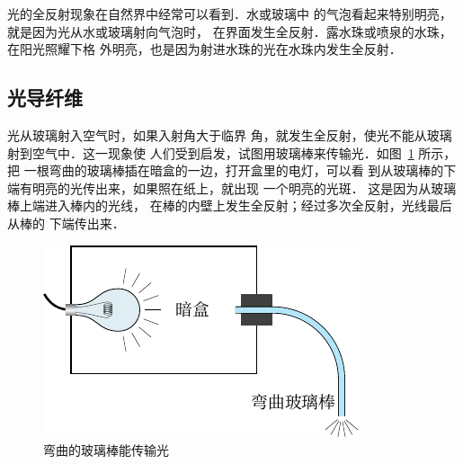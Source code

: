 光的全反射现象在自然界中经常可以看到．水或玻璃中
的气泡看起来特别明亮，就是因为光从水或玻璃射向气泡时，
在界面发生全反射．露水珠或喷泉的水珠，在阳光照耀下格
外明亮，也是因为射进水珠的光在水珠内发生全反射．

\subsection{光导纤维}


光从玻璃射入空气时，如果入射角大于临界
角，就发生全反射，使光不能从玻璃射到空气中．这一现象使
人们受到启发，试图用玻璃棒来传输光．如图~\ref{fig_C_5-24} 所示，把
一根弯曲的玻璃棒插在暗盒的一边，打开盒里的电灯，可以看
到从玻璃棒的下端有明亮的光传出来，如果照在纸上，就出现
一个明亮的光斑．
这是因为从玻璃棒上端进入棒内的光线，
在棒的内壁上发生全反射；经过多次全反射，光线最后从棒的
下端传出来．
\begin{figure}[htbp]
	\centering
	\includegraphics{fig/C/5-24.pdf}
	\caption{弯曲的玻璃棒能传输光}\label{fig_C_5-24}
\end{figure}




